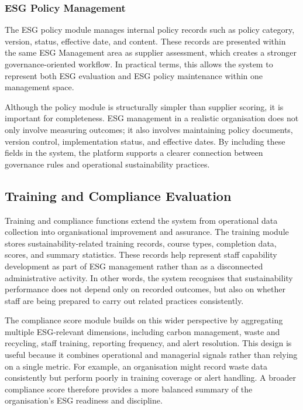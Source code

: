 \documentclass[11pt,a4paper]{article}
\begin{document}
\subsubsection{ESG Policy Management}
The ESG policy module manages internal policy records such as policy category, version, status, effective date, and content. These records are presented within the same ESG Management area as supplier assessment, which creates a stronger governance-oriented workflow. In practical terms, this allows the system to represent both ESG evaluation and ESG policy maintenance within one management space.

Although the policy module is structurally simpler than supplier scoring, it is important for completeness. ESG management in a realistic organisation does not only involve measuring outcomes; it also involves maintaining policy documents, version control, implementation status, and effective dates. By including these fields in the system, the platform supports a clearer connection between governance rules and operational sustainability practices.

\subsection{Training and Compliance Evaluation}
Training and compliance functions extend the system from operational data collection into organisational improvement and assurance. The training module stores sustainability-related training records, course types, completion data, scores, and summary statistics. These records help represent staff capability development as part of ESG management rather than as a disconnected administrative activity. In other words, the system recognises that sustainability performance does not depend only on recorded outcomes, but also on whether staff are being prepared to carry out related practices consistently.

The compliance score module builds on this wider perspective by aggregating multiple ESG-relevant dimensions, including carbon management, waste and recycling, staff training, reporting frequency, and alert resolution. This design is useful because it combines operational and managerial signals rather than relying on a single metric. For example, an organisation might record waste data consistently but perform poorly in training coverage or alert handling. A broader compliance score therefore provides a more balanced summary of the organisation's ESG readiness and discipline.
\end{document}
